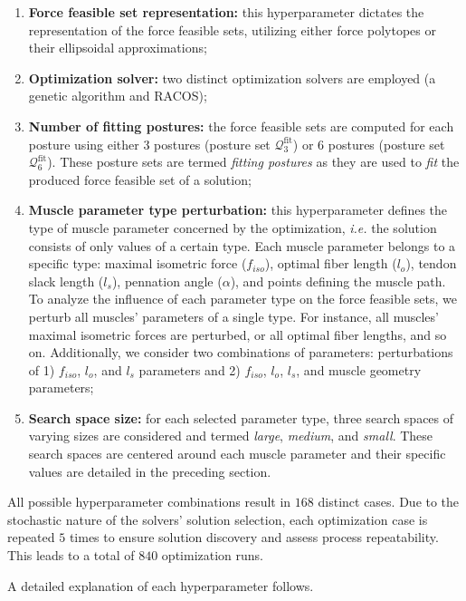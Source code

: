 \begin{enumerate}
    \item \textbf{Force feasible set representation:} this hyperparameter dictates the representation of the force feasible sets, utilizing either force polytopes or their ellipsoidal approximations;
    \item \textbf{Optimization solver:} two distinct optimization solvers are employed (a genetic algorithm and RACOS);
    \item \textbf{Number of fitting postures:} the force feasible sets are computed for each posture using either 3 postures (posture set $\mathcal{Q}_3^{\text{fit}}$) or 6 postures (posture set $\mathcal{Q}_6^{\text{fit}}$). These posture sets are termed \emph{fitting postures} as they are used to \emph{fit} the produced force feasible set of a solution;
    \item \textbf{Muscle parameter type perturbation:} this hyperparameter defines the type of muscle parameter concerned by the optimization, \emph{i.e.} the solution consists of only values of a certain type. Each muscle parameter belongs to a specific type: maximal isometric force ($f_{iso}$), optimal fiber length ($l_o$), tendon slack length ($l_s$), pennation angle ($\alpha$), and points defining the muscle path. To analyze the influence of each parameter type on the force feasible sets, we perturb all muscles' parameters of a single type. For instance, all muscles' maximal isometric forces are perturbed, or all optimal fiber lengths, and so on. Additionally, we consider two combinations of parameters: perturbations of 1) $f_{iso}$, $l_o$, and $l_s$ parameters and 2) $f_{iso}$, $l_o$, $l_s$, and muscle geometry parameters;
    \item \textbf{Search space size:} for each selected parameter type, three search spaces of varying sizes are considered and termed \emph{large}, \emph{medium}, and \emph{small}. These search spaces are centered around each muscle parameter and their specific values are detailed in the preceding section.
\end{enumerate}

All possible hyperparameter combinations result in $168$ distinct cases. Due to the stochastic nature of the solvers' solution selection, each optimization case is repeated $5$ times to ensure solution discovery and assess process repeatability. This leads to a total of $840$ optimization runs.

A detailed explanation of each hyperparameter follows.

